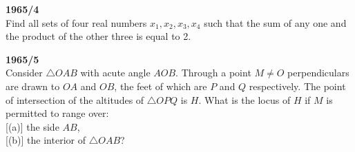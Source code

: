 \documentclass[12pt]{article}
\begin{document}
\textbf{1965/4}\\
Find all sets of four real numbers $x_1, x_2, x_3, x_4$ such that the sum of any one and the product of the other three is equal to 2.

\textbf{1965/5}\\
Consider $\triangle OAB$ with acute angle $AOB$. Through a point $M \neq O$ perpendiculars are drawn to $OA$ and $OB$, the feet of which are $P$ and $Q$ respectively. The point of intersection of the altitudes of $\triangle OPQ$ is $H$. What is the locus of $H$ if $M$ is permitted to range over:\\ 
\hspace*{3em}[(a)] the side $AB$,\\
\hspace*{3em}[(b)] the interior of $\triangle OAB$?
\end{document}
